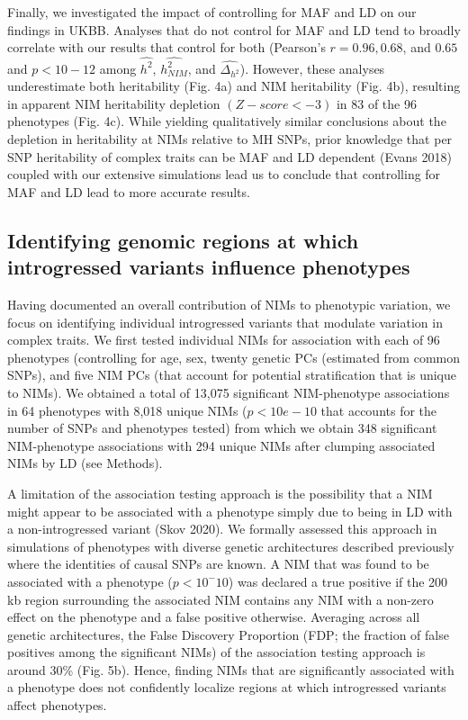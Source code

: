 Finally, we investigated the impact of controlling for MAF and LD on our findings in UKBB. Analyses that do not control for MAF and LD tend to broadly correlate with our results that control for both (Pearson’s $r = 0.96, 0.68$, and $0.65$ and $p < 10-12$ among $\hat{h^2}$, $\hat{h^2_{NIM}}$, and $\hat{\Delta_{h^2}}$). However, these analyses underestimate both heritability (Fig. 4a) and NIM heritability (Fig. 4b), resulting in apparent NIM heritability depletion $(Z-score < -3)$ in 83 of the 96 phenotypes (Fig. 4c). While yielding qualitatively similar conclusions about the depletion in heritability at NIMs relative to MH SNPs, prior knowledge that per SNP heritability of complex traits can be MAF and LD dependent (Evans 2018) coupled with our extensive simulations lead us to conclude that controlling for MAF and LD lead to more accurate results. 

\subsection{Identifying genomic regions at which introgressed variants influence phenotypes}
Having documented an overall contribution of NIMs to phenotypic variation, we focus on identifying individual introgressed variants that modulate variation in complex traits. We first tested individual NIMs for association with each of 96 phenotypes (controlling for age, sex, twenty genetic PCs (estimated from common SNPs), and five NIM PCs (that account for potential stratification that is unique to NIMs). We obtained a total of 13,075 significant NIM-phenotype associations in 64 phenotypes with 8,018 unique NIMs ($p < 10e-10$ that accounts for the number of SNPs and phenotypes tested)  from which we obtain 348 significant NIM-phenotype associations with 294 unique NIMs after clumping associated NIMs by LD (see Methods).
 
A limitation of the association testing approach is the possibility that a NIM might appear to be associated with a phenotype simply due to being in LD with a non-introgressed variant (Skov 2020). We formally assessed this approach in simulations of phenotypes with diverse genetic architectures described previously where the identities of causal SNPs are known. A NIM that was found to be associated with a phenotype ($p < 10^-10$) was declared a true positive if the 200 kb region surrounding the associated NIM contains any NIM with a non-zero effect on the phenotype and a false positive otherwise. Averaging across all genetic architectures, the False Discovery Proportion (FDP; the fraction of false positives among the significant NIMs) of the association testing approach is around 30\% (Fig. 5b). Hence, finding NIMs that are significantly associated with a phenotype does not confidently localize regions at which introgressed variants affect phenotypes.

